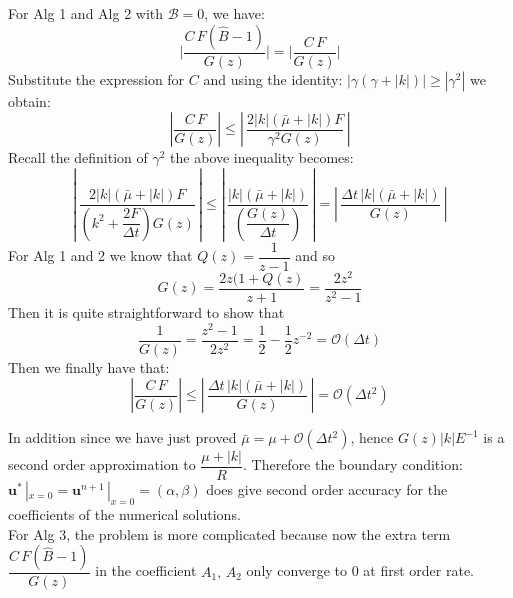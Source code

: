 For Alg 1 and Alg 2 with $\mathcal{B} = 0$, we have:
\begin{equation*}
\vert \dfrac{C\,F(\hat{B} -1)}{G(z)}\vert = \vert \dfrac{C\,F}{G(z)}\vert
\end{equation*}
Substitute the expression for $C$ and using the identity: $| \gamma (\gamma + |k|) | \geqslant |\gamma^2|$ we obtain:
\begin{equation*}
|\dfrac{C\,F}{G(z)}| \leqslant |\,\dfrac{2|k|(\bar{\mu}+|k|)F}{\gamma^2G(z)}\,|
\end{equation*}
Recall the definition of $\gamma^2$ the above inequality becomes:
\begin{equation*}
|\,\dfrac{2|k|(\bar{\mu}+|k|)F}{\left(k^2+ \dfrac{2F}{\Delta t}\right) G(z)}\,| \leqslant |\,\dfrac{|k|(\bar{\mu}+|k|)}{\left(\dfrac{G(z)}{\Delta t}\right)}\,| = |\,\dfrac{\Delta t \,|k|(\bar{\mu}+|k|)}{G(z)}\,| 
\end{equation*}
For Alg 1 and 2 we know that $Q(z) = \dfrac{1}{z-1}$ and so
\begin{equation*}
G(z) = \dfrac{2z(1+Q(z)}{z+1} = \dfrac{2z^2}{z^2-1}
\end{equation*}
Then it is quite straightforward to show that 
\begin{equation*}
\dfrac{1}{G(z)} = \dfrac{z^2-1}{2z^2} = \dfrac{1}{2} - \dfrac{1}{2}z^{-2} = \mathcal{O}(\Delta t)
\end{equation*}
Then we finally have that:
\begin{equation}
|\dfrac{C\,F}{G(z)}| \leqslant |\,\dfrac{\Delta t \,|k|(\bar{\mu}+|k|)}{G(z)}\,| = \mathcal{O}(\Delta t^2)
\end{equation}

In addition since we have just proved $\bar{\mu} = \mu + \mathcal{O} (\Delta t^2)$, hence $G(z) |k|E^{-1}$ is a second order approximation to $\dfrac{\mu + |k|}{R} $. Therefore the boundary condition: $\textbf{u}^* \,|_{x=0} = \textbf{u}^{n+1}\,|_{x=0} = (\alpha,\beta)$ does give second order accuracy for the coefficients of the numerical solutions.\\

For Alg 3, the problem is more complicated because now the extra term $\dfrac{C \, F(\hat{B} - 1)}{G(z)}$ in the coefficient $A_1,\,A_2$ only converge to 0 at first order rate. \\

